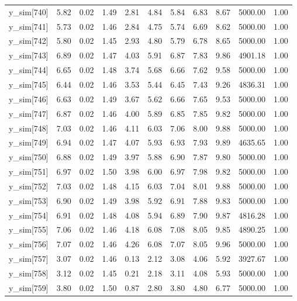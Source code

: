 \begin{table}[ht]
\begin{tabular}{rrrrrrrrrrr}
  y\_sim[740] & 5.82 & 0.02 & 1.49 & 2.81 & 4.84 & 5.84 & 6.83 & 8.67 & 5000.00 & 1.00 \\ 
  y\_sim[741] & 5.73 & 0.02 & 1.46 & 2.84 & 4.75 & 5.74 & 6.69 & 8.62 & 5000.00 & 1.00 \\ 
  y\_sim[742] & 5.80 & 0.02 & 1.45 & 2.93 & 4.80 & 5.79 & 6.78 & 8.65 & 5000.00 & 1.00 \\ 
  y\_sim[743] & 6.89 & 0.02 & 1.47 & 4.03 & 5.91 & 6.87 & 7.83 & 9.86 & 4901.18 & 1.00 \\ 
  y\_sim[744] & 6.65 & 0.02 & 1.48 & 3.74 & 5.68 & 6.66 & 7.62 & 9.58 & 5000.00 & 1.00 \\ 
  y\_sim[745] & 6.44 & 0.02 & 1.46 & 3.53 & 5.44 & 6.45 & 7.43 & 9.26 & 4836.31 & 1.00 \\ 
  y\_sim[746] & 6.63 & 0.02 & 1.49 & 3.67 & 5.62 & 6.66 & 7.65 & 9.53 & 5000.00 & 1.00 \\ 
  y\_sim[747] & 6.87 & 0.02 & 1.46 & 4.00 & 5.89 & 6.85 & 7.85 & 9.82 & 5000.00 & 1.00 \\ 
  y\_sim[748] & 7.03 & 0.02 & 1.46 & 4.11 & 6.03 & 7.06 & 8.00 & 9.88 & 5000.00 & 1.00 \\ 
  y\_sim[749] & 6.94 & 0.02 & 1.47 & 4.07 & 5.93 & 6.93 & 7.93 & 9.89 & 4635.65 & 1.00 \\ 
  y\_sim[750] & 6.88 & 0.02 & 1.49 & 3.97 & 5.88 & 6.90 & 7.87 & 9.80 & 5000.00 & 1.00 \\ 
  y\_sim[751] & 6.97 & 0.02 & 1.50 & 3.98 & 6.00 & 6.97 & 7.98 & 9.82 & 5000.00 & 1.00 \\ 
  y\_sim[752] & 7.03 & 0.02 & 1.48 & 4.15 & 6.03 & 7.04 & 8.01 & 9.88 & 5000.00 & 1.00 \\ 
  y\_sim[753] & 6.90 & 0.02 & 1.49 & 3.98 & 5.92 & 6.91 & 7.88 & 9.83 & 5000.00 & 1.00 \\ 
  y\_sim[754] & 6.91 & 0.02 & 1.48 & 4.08 & 5.94 & 6.89 & 7.90 & 9.87 & 4816.28 & 1.00 \\ 
  y\_sim[755] & 7.06 & 0.02 & 1.46 & 4.18 & 6.08 & 7.08 & 8.05 & 9.85 & 4890.25 & 1.00 \\ 
  y\_sim[756] & 7.07 & 0.02 & 1.46 & 4.26 & 6.08 & 7.07 & 8.05 & 9.96 & 5000.00 & 1.00 \\ 
  y\_sim[757] & 3.07 & 0.02 & 1.46 & 0.13 & 2.12 & 3.08 & 4.06 & 5.92 & 3927.67 & 1.00 \\ 
  y\_sim[758] & 3.12 & 0.02 & 1.45 & 0.21 & 2.18 & 3.11 & 4.08 & 5.93 & 5000.00 & 1.00 \\ 
  y\_sim[759] & 3.80 & 0.02 & 1.50 & 0.87 & 2.80 & 3.80 & 4.80 & 6.77 & 5000.00 & 1.00 \\ 

\end{tabular}
\end{table}
